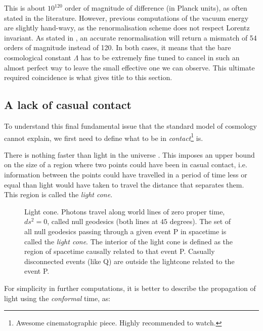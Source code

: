 \documentclass[11pt, a4paper]{article} %
\begin{document}
This is about $10^{120}$ order of magnitude of difference (in Planck units), as often stated in the literature. However, previous computations of the vacuum energy are slightly hand-wavy, as the renormalisation scheme does not respect Lorentz invariant. As stated in \cite{Martin_2012}, an accurate renormalisation will return a mismatch of 54 orders of magnitude instead of 120. In both cases, it means that the bare cosmological constant $\Lambda$ has to be extremely fine tuned to cancel in such an almost perfect way to leave the small effective one we can observe. This ultimate required coincidence is what gives title to this section. 

\subsection*{A lack of casual contact}

To understand this final fundamental issue that the standard model of cosmology cannot explain, we first need to define what to be in \textit{contact}\footnote{Awesome cinematographic piece. Highly recommended to watch.} is.

There is nothing faster than light in the universe \cite{carroll2019spacetime}. This imposes an upper bound on the size of a region where two points could have been in casual contact, i.e. information between the points could have travelled in a period of time less or equal than light would have taken to travel the distance that separates them. This region is called the \textit{light cone}.
\vspace{0.5cm} %
\begin{figure}[h]
    \centering
    
	\caption{Light cone. Photons travel along world lines of zero proper time, $ds^{2} = 0$, called null geodesics (both lines at $45$ degrees). The set of all null geodesics passing through a given event P in spacetime is called the \textit{light cone}. The interior of the light cone is defined as the region of spacetime causally related to that event P. Casually disconnected events (like Q) are outside the lightcone related to the event P.}
	\label{Fig: light_cone}
\end{figure}

For simplicity in further computations, it is better to describe the propagation of light using the \textit{conformal} time, as:
\end{document}
